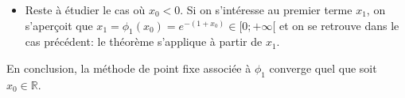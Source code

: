 {\begin{enumerate}
{\begin{itemize}
			\item Reste à étudier le cas où $x_0 < 0$. Si on s'intéresse au premier terme $x_1$, on s'aperçoit que $x_1=\phi_1(x_0)=e^{-(1+x_0)}\in[0;+\infty[$ et on se retrouve dans le cas précédent: le théorème s'applique à partir de $x_1$.
		\end{itemize}
		En conclusion, la méthode de point fixe associée à $\phi_1$ converge quel que soit $x_0\in\mathbb{R}$.
	}
\end{enumerate}
}